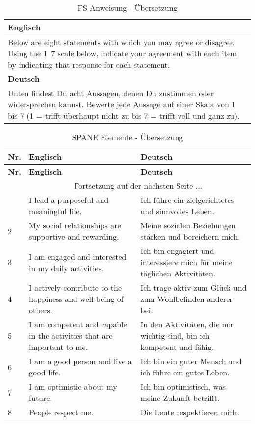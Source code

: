\begin{RaggedRight}
\begin{center}
    \begin{longtable}[t]{|p{15 cm}|}
    \caption{FS Anweisung - Übersetzung} \\ \hline
        \textbf{Englisch} \\ \hline
        Below are eight statements with which you may agree or disagree. Using the 1–7 scale below, indicate your agreement with each item by indicating that response for each statement. \\ \hline
        \textbf{Deutsch} \\ \hline 
        Unten findest Du acht Aussagen, denen Du zustimmen oder widersprechen kannst. Bewerte jede Aussage auf einer Skala von 1 bis 7 (1 = trifft überhaupt nicht zu bis 7 = trifft voll und ganz zu). \\ \hline   
    \end{longtable}
	\label{tab:FsAnweisung}
\end{center}

\begin{center}
    \begin{longtable}[t]{|p{0.8 cm}|p{6.6 cm}|p{6.6 cm}|}
    \caption{SPANE Elemente - Übersetzung} \\ \hline
        \textbf{Nr.} & \textbf{Englisch} & \textbf{Deutsch} \\ \hline
        \endfirsthead
        \hline
        \textbf{Nr.} & \textbf{Englisch} & \textbf{Deutsch} \\ \hline
        \endhead 
        & \multicolumn{2}{|c|}{Fortsetzung auf der nächsten Seite $...$ } \\ \hline
        \endfoot
        \hline
        \endlastfoot
        1 & I lead a purposeful and meaningful life. & Ich führe ein zielgerichtetes und sinnvolles Leben.\\
        2 & My social relationships are supportive and rewarding. & Meine sozialen Beziehungen stärken und bereichern mich. \\
        3 & I am engaged and interested in my daily activities. & Ich bin engagiert und interessiere mich für meine täglichen Aktivitäten.\\
        4 & I actively contribute to the happiness and well-being of others. & Ich trage aktiv zum Glück und zum Wohlbefinden anderer bei.\\
        5 & I am competent and capable in the activities that are important to me. & In den Aktivitäten, die mir wichtig sind, bin ich kompetent und fähig.\\
        6 & I am a good person and live a good life. & Ich bin ein guter Mensch und ich führe ein gutes Leben. \\
        7 & I am optimistic about my future. & Ich bin optimistisch, was meine Zukunft betrifft.\\
        8 & People respect me. & Die Leute respektieren mich.\\        
    \end{longtable}
	\label{tab:FsElemente}
\end{center}


\end{RaggedRight}


